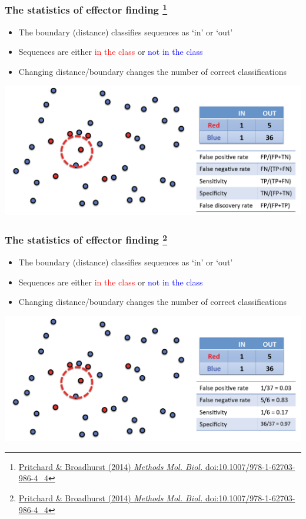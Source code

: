 \begin{frame}
  \frametitle{The statistics of effector finding
  \footnote{\tiny{\href{http://dx.doi.org/10.1007/978-1-62703-986-4_4}{Pritchard \& Broadhurst (2014) \textit{Methods Mol. Biol.} doi:10.1007/978-1-62703-986-4\_4}}}
}
  \begin{itemize}
    \item \textcolor{hutton_green}{The boundary (distance) classifies sequences as `in' or `out'}
    \item Sequences are either \textcolor{red}{in the class} or \textcolor{blue}{not in the class}
    \item \textcolor{hutton_purple}{Changing distance/boundary changes the number of correct classifications}
  \end{itemize}
  \includegraphics[width=1\textwidth]{images/finding_effectors7}    
\end{frame}

\begin{frame}
  \frametitle{The statistics of effector finding
  \footnote{\tiny{\href{http://dx.doi.org/10.1007/978-1-62703-986-4_4}{Pritchard \& Broadhurst (2014) \textit{Methods Mol. Biol.} doi:10.1007/978-1-62703-986-4\_4}}}
}
  \begin{itemize}
    \item \textcolor{hutton_green}{The boundary (distance) classifies sequences as `in' or `out'}
    \item Sequences are either \textcolor{red}{in the class} or \textcolor{blue}{not in the class}
    \item \textcolor{hutton_purple}{Changing distance/boundary changes the number of correct classifications}
  \end{itemize}
  \includegraphics[width=1\textwidth]{images/finding_effectors8}    
\end{frame}

